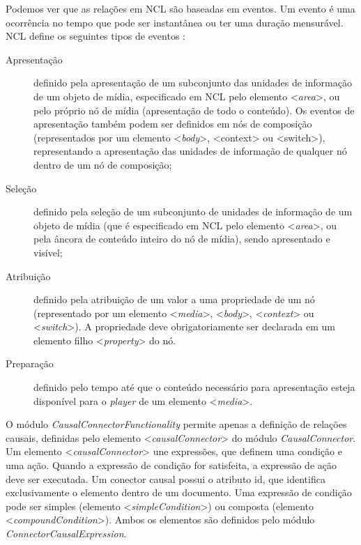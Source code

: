 Podemos ver que as relações em NCL são baseadas em eventos. Um evento é uma ocorrência no tempo que pode ser instantânea ou ter uma duração mensurável. NCL define os seguintes tipos de eventos \cite{abnt-sbtvd}:

\begin{description}
  
   \item[Apresentação] definido pela apresentação de um subconjunto das unidades de informação de um objeto de mídia, especificado em NCL pelo elemento <\textit{area}>, ou pelo próprio nó de mídia (apresentação de todo o conteúdo). Os eventos de apresentação também podem ser definidos em nós de composição (representados por um elemento <\textit{body}>, <context> ou <switch>), representando a apresentação das unidades de informação de qualquer nó dentro de um nó de composição;

   \item[Seleção] definido pela seleção de um subconjunto de unidades de informação de um objeto de mídia (que é especificado em NCL pelo elemento <\textit{area}>, ou pela âncora de conteúdo inteiro do nó de mídia), sendo apresentado e visível;
   
    \item[Atribuição] definido pela atribuição de um valor a uma propriedade de um nó (representado por um elemento <\textit{media}>, <\textit{body}>, <\textit{context}> ou <\textit{switch}>). A propriedade deve obrigatoriamente ser declarada em um elemento filho <\textit{property}> do nó.
    
    \item[Preparação] definido pelo tempo até que o conteúdo necessário para apresentação esteja disponível para o \textit{player} de um elemento <\textit{media}>.
    
   
\end{description}

O módulo \textit{CausalConnectorFunctionality} permite apenas a definição de relações causais, definidas pelo elemento <\textit{causalConnector}> do módulo \textit{CausalConnector}. Um elemento <\textit{causalConnector}> une expressões, que definem uma condição e uma ação. Quando a expressão de condição for satisfeita, a expressão de ação deve ser executada. Um conector causal  possui o atributo id, que identifica exclusivamente o elemento dentro de um documento.
Uma expressão de condição pode ser simples (elemento <\textit{simpleCondition}>) ou composta (elemento <\textit{compoundCondition}>). Ambos os elementos são definidos pelo módulo \textit{ConnectorCausalExpression}.
 
